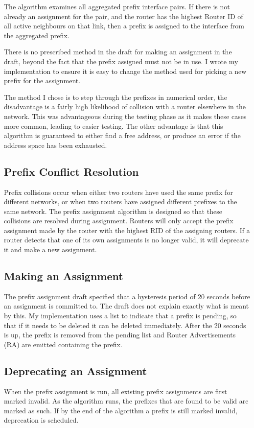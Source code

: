 \documentclass[12pt]{report}
\begin{document}
The algorithm examines all aggregated prefix interface pairs. If
there is not already an assignment for the pair, and the router has the
highest Router ID of all active neighbours on that link, then a
prefix is assigned to the interface from the aggregated prefix. 

There is no prescribed method in the draft for making an assignment in the
draft, beyond the fact that the prefix assigned must not be in use. I wrote my
implementation to ensure it is easy to change the method used for picking a new
prefix for the assignment. 

The method I chose is to step through the prefixes in numerical order, the
disadvantage is a fairly high likelihood of collision with a router elsewhere
in the network. This was advantageous during the testing phase as it makes
these cases more common, leading to easier testing. The other advantage is that
this algorithm is guaranteed to either find a free address, or produce an error
if the address space has been exhausted. 

\subsection{Prefix Conflict Resolution}
Prefix collisions occur when either two routers have used the same prefix for
different networks, or when two routers have assigned different prefixes to the
same network. The prefix assignment algorithm is designed so that these
collisions are resolved during assignment. Routers will only accept the prefix
assignment made by the router with the highest RID of the assigning routers. If
a router detects that one of its own assignments is no longer valid, it will
deprecate it and make a new assignment. 

\subsection{Making an Assignment}
The prefix assignment draft specified that a hysteresis period of 20 seconds
before an assignment is committed to. The draft does not explain exactly what
is meant by this. My implementation uses a list to indicate that a prefix is
pending, so that if it needs to be deleted it can be deleted immediately. After
the 20 seconds is up, the prefix is removed from the pending list and Router
Advertisements (RA) are emitted containing the prefix.
 
\subsection{Deprecating an Assignment}
When the prefix assignment is run, all existing prefix assignments are first
marked invalid. As the algorithm runs, the prefixes that are found to be valid
are marked as such. If by the end of the algorithm a prefix is still marked
invalid, deprecation is scheduled. 
\end{document}
